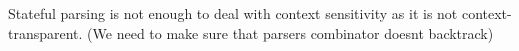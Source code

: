 	Stateful parsing is not enough to deal with context sensitivity as it is not context-transparent. (We need to make sure that parsers combinator doesnt backtrack)



